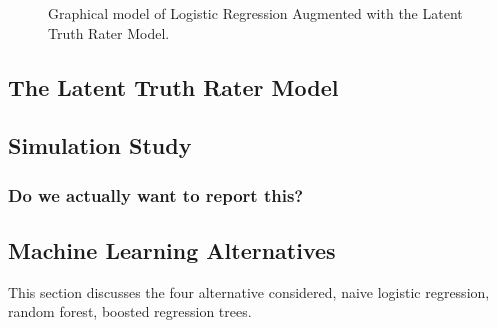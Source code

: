 \documentclass[a4paper,11pt]{article}
\begin{document}
\begin{figure}[!ht]
	\caption{Graphical model of Logistic Regression Augmented with the Latent Truth Rater Model.}
	\label{model:Logistic_LTM}
\end{figure}

\subsection{The Latent Truth Rater Model}

%

\subsection{Simulation Study}

\subsubsection{Do we actually want to report this?}

\subsection{Machine Learning Alternatives}
This section discusses the four alternative considered, naive logistic regression, random forest, boosted regression trees.
\end{document}

